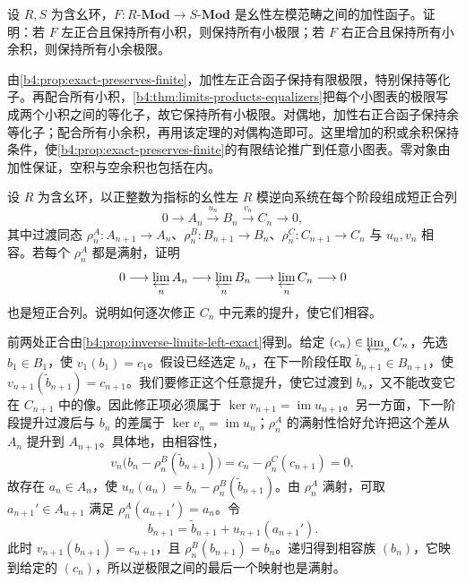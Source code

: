 \begin{exercise}\label{b4:ex:02-limits-exact-criterion}
	设 \(R,S\) 为含幺环，\(F:R\text{-}\mathbf{Mod}\rightarrow S\text{-}\mathbf{Mod}\) 是幺性左模范畴之间的加性函子。证明：若 \(F\) 左正合且保持所有小积，则保持所有小极限；若 \(F\) 右正合且保持所有小余积，则保持所有小余极限。
\end{exercise}
\begin{solution}
	由\cref{b4:prop:exact-preserves-finite}，加性左正合函子保持有限极限，特别保持等化子。再配合所有小积，\cref{b4:thm:limits-products-equalizers}把每个小图表的极限写成两个小积之间的等化子，故它保持所有小极限。对偶地，加性右正合函子保持余等化子；配合所有小余积，再用该定理的对偶构造即可。这里增加的积或余积保持条件，使\cref{b4:prop:exact-preserves-finite}的有限结论推广到任意小图表。零对象由加性保证，空积与空余积也包括在内。
\end{solution}

\begin{exercise}\label{b4:ex:02-inverse-left-exact}
	设 \(R\) 为含幺环，以正整数为指标的幺性左 \(R\) 模逆向系统在每个阶段组成短正合列
	\[
		0\longrightarrow A_n\xrightarrow{u_n}B_n \xrightarrow{v_n}C_n\longrightarrow0,
	\]
	其中过渡同态 \(\rho_n^A:A_{n+1}\rightarrow A_n\)、\(\rho_n^B:B_{n+1}\rightarrow B_n\)、\(\rho_n^C:C_{n+1}\rightarrow C_n\) 与 \(u_n,v_n\) 相容。若每个 \(\rho_n^A\) 都是满射，证明
	\[
		0\longrightarrow\varprojlim_nA_n \longrightarrow\varprojlim_nB_n \longrightarrow\varprojlim_nC_n\longrightarrow0
	\]
	也是短正合列。说明如何逐次修正 \(C_n\) 中元素的提升，使它们相容。
\end{exercise}
\begin{solution}
	前两处正合由\cref{b4:prop:inverse-limits-left-exact}得到。给定 \((c_n)\in\varprojlim_nC_n\)，先选 \(b_1\in B_1\)，使 \(v_1(b_1)=c_1\)。假设已经选定 \(b_n\)，在下一阶段任取 \(\widetilde b_{n+1}\in B_{n+1}\)，使 \(v_{n+1}(\widetilde b_{n+1})=c_{n+1}\)。我们要修正这个任意提升，使它过渡到 \(b_n\)，又不能改变它在 \(C_{n+1}\) 中的像。因此修正项必须属于 \(\ker v_{n+1}=\operatorname{im}u_{n+1}\)。另一方面，下一阶段提升过渡后与 \(b_n\) 的差属于 \(\ker v_n=\operatorname{im}u_n\)；\(\rho_n^A\) 的满射性恰好允许把这个差从 \(A_n\) 提升到 \(A_{n+1}\)。具体地，由相容性，
	\[
		v_n\bigl(b_n-\rho_n^B(\widetilde b_{n+1})\bigr) =c_n-\rho_n^C(c_{n+1})=0,
	\]
	故存在 \(a_n\in A_n\)，使 \(u_n(a_n)=b_n-\rho_n^B(\widetilde b_{n+1})\)。由 \(\rho_n^A\) 满射，可取 \(a_{n+1}'\in A_{n+1}\) 满足 \(\rho_n^A(a_{n+1}')=a_n\)。令
	\[
		b_{n+1}=\widetilde b_{n+1}+u_{n+1}(a_{n+1}').
	\]
	此时 \(v_{n+1}(b_{n+1})=c_{n+1}\)，且 \(\rho_n^B(b_{n+1})=b_n\)。递归得到相容族 \((b_n)\)，它映到给定的 \((c_n)\)，所以逆极限之间的最后一个映射也是满射。
\end{solution}
